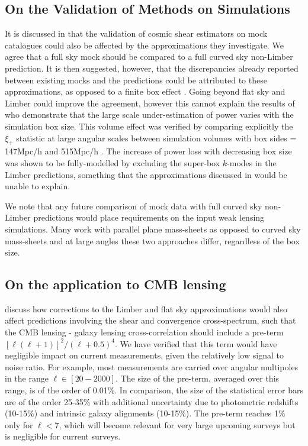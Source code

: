 \subsection{On the Validation of Methods on Simulations}
It is discussed in \citet{kitching/etal:2016} that the validation of cosmic shear estimators on mock catalogues could also be affected by the approximations they investigate.  We agree that a full sky mock should be compared to a full curved sky non-Limber prediction.  It is then suggested, however, that the discrepancies already reported between existing mocks and the predictions could be attributed to these approximations, as opposed to a finite box effect \citep{kiessling/etal:2011, harnois-deraps/etal:2012, harnois-deraps/vanwaerbeke:2015}.  Going beyond flat sky and Limber could improve the agreement, however this cannot explain the results of \citet{harnois-deraps/vanwaerbeke:2015} who demonstrate that the large scale under-estimation of power varies with the simulation box size. This volume effect was verified by comparing explicitly the $\xi_+$ statistic at large angular scales between simulation volumes with box sides = 147Mpc/h and 515Mpc/h \citep[see Fig. 5 in][]{harnois-deraps/vanwaerbeke:2015}. The increase of power loss with decreasing box size was shown to be fully-modelled by excluding the super-box $k$-modes in the Limber predictions, something that the approximations discussed in \citet{kitching/etal:2016} would be unable to explain.

We note that any future comparison of mock data with full curved sky non-Limber predictions would place requirements on the input weak lensing simulations.  Many work with parallel plane mass-sheets as opposed to curved sky mass-sheets and at large angles these two approaches differ, regardless of the box size. 

\subsection{On the application to CMB lensing}
\citet{kitching/etal:2016} discuss how corrections to the Limber and flat sky approximations would also affect predictions involving the shear and convergence cross-spectrum, such that the CMB lensing - galaxy lensing cross-correlation should include a pre-term $ [\ell(\ell+1)]^2/(\ell+ 0.5)^4$.   We have verified that this term would have negligible impact on current measurements, given the relatively low signal to noise ratio.  For example, most measurements \citep{hand/etal:2015, liu/hill:2015, kirk/etal:2016,harnois-deraps/etal:2016} are carried over angular multipoles in the range $\ell \in [20-2000]$.  The size of the pre-term, averaged over this range, is of the order of 0.01\%. In comparison, the size of the statistical error bars are of the order 25-35\% with additional uncertainty due to photometric redshifts (10-15\%) and intrinsic galaxy alignments (10-15\%). The pre-term reaches 1\% only for $\ell < 7$, which will become relevant for very large upcoming surveys but is negligible for current surveys. 



